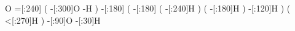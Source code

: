            O%
    =[:240]%
              (
        -[:300]O%
              -H%
              )
    -[:180]%
              (
        -[:180]%
                  (
            -[:240]H%
                  )
                  (
            -[:180]H%
                  )
        -[:120]H%
              )
              (
        <[:270]H%
              )
     -[:90]O%
     -[:30]H%
